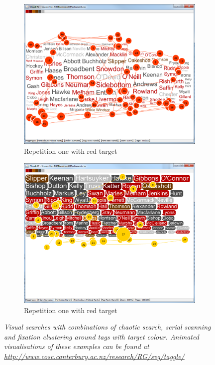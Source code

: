 \begin{figure}[!htb]
\begin{subfigure}{.5\textwidth}
  \centering
  \includegraphics[scale=0.25]{combsearchgazetrial1fgsp.png}
  \caption{Repetition one with red target}
\end{subfigure}%
\begin{subfigure}{.5\textwidth}
  \centering
  \includegraphics[scale=0.25]{combsearchgazetrial1bgty.png}
  \caption{Repetition one with red target}
\end{subfigure}
\caption{\textit{Visual searches with combinations of chaotic search, serial scanning and fixation clustering around tags with target colour. Animated visualisations of these examples can be found at \url{http://www.cosc.canterbury.ac.nz/research/RG/svg/taggle/}}}
\label{fig:combinationsearch}
\end{figure}

